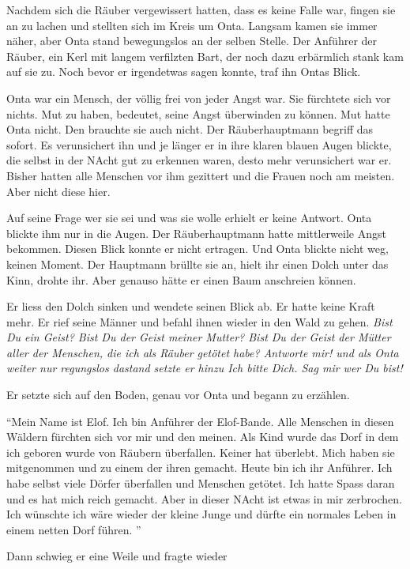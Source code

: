 Nachdem sich die Räuber vergewissert hatten, dass  es keine Falle war, fingen sie an zu lachen und stellten sich im Kreis um Onta. Langsam kamen sie immer näher, aber Onta stand bewegungslos an der selben Stelle. Der Anführer der Räuber, ein Kerl mit langem verfilzten Bart, der noch dazu erbärmlich stank kam auf sie zu. Noch bevor er irgendetwas sagen konnte, traf ihn Ontas Blick. 

Onta war ein Mensch, der völlig frei von jeder Angst war. Sie fürchtete sich vor nichts. Mut zu haben, bedeutet, seine Angst überwinden zu können. Mut hatte Onta nicht. Den brauchte sie auch nicht. Der Räuberhauptmann begriff das sofort. Es verunsichert ihn und je länger er in ihre klaren blauen Augen blickte, die selbst in der NAcht gut zu erkennen waren, desto mehr verunsichert war er. Bisher hatten alle Menschen vor ihm gezittert und die Frauen noch am meisten. Aber nicht diese hier.

Auf seine Frage wer sie sei und was sie wolle erhielt er keine Antwort. Onta blickte ihm nur in die Augen. Der Räuberhauptmann hatte mittlerweile Angst bekommen. Diesen Blick konnte er nicht ertragen. Und Onta blickte nicht weg, keinen Moment. Der Hauptmann brüllte sie an, hielt ihr einen Dolch unter das Kinn, drohte ihr. Aber genauso hätte er einen Baum anschreien können. 

Er liess den Dolch sinken und wendete seinen Blick ab. Er hatte keine Kraft mehr. Er rief seine Männer und befahl ihnen wieder in den Wald zu gehen. \itshape{Bist Du ein Geist? Bist Du der Geist meiner Mutter? Bist Du der Geist der Mütter aller der Menschen, die ich als Räuber getötet habe? Antworte mir!} und als Onta weiter nur regungslos dastand setzte er hinzu \itshape{Ich bitte Dich. Sag mir wer Du bist!}

Er setzte sich auf den Boden, genau vor Onta und begann zu erzählen.

\enquote{Mein Name ist Elof. Ich bin Anführer der Elof-Bande. Alle Menschen in diesen Wäldern fürchten sich vor mir und den meinen. Als Kind wurde das Dorf in dem ich geboren wurde von Räubern überfallen. Keiner hat überlebt. Mich haben sie mitgenommen und zu einem der ihren gemacht. Heute bin ich ihr Anführer. Ich habe selbst viele Dörfer überfallen und Menschen getötet. Ich hatte Spass daran und es hat mich reich gemacht. Aber in dieser NAcht ist etwas in mir zerbrochen. Ich wünschte ich wäre wieder der kleine Junge und dürfte ein normales Leben in einem netten Dorf führen. }

Dann schwieg er eine Weile und fragte wieder

